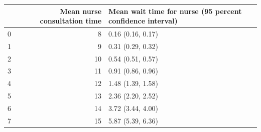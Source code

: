 \begin{tabular}{lrl}
\toprule
 & Mean nurse consultation time & Mean wait time for nurse (95 percent confidence interval) \\
\midrule
0 & 8 & 0.16 (0.16, 0.17) \\
1 & 9 & 0.31 (0.29, 0.32) \\
2 & 10 & 0.54 (0.51, 0.57) \\
3 & 11 & 0.91 (0.86, 0.96) \\
4 & 12 & 1.48 (1.39, 1.58) \\
5 & 13 & 2.36 (2.20, 2.52) \\
6 & 14 & 3.72 (3.44, 4.00) \\
7 & 15 & 5.87 (5.39, 6.36) \\
\bottomrule
\end{tabular}
